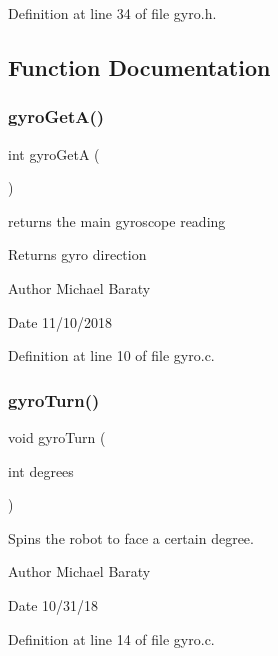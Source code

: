 Definition at line 34 of file gyro.\+h.



\subsection{Function Documentation}
\mbox{\label{gyro_8h_a5a5a31229f1d815f1b9ebd4ddd1a58ff}} 
\subsubsection{gyro\+Get\+A()}
{\footnotesize\ttfamily int gyro\+GetA (\begin{DoxyParamCaption}{ }\end{DoxyParamCaption})}



returns the main gyroscope reading 

\begin{DoxyReturn}{Returns}
gyro direction 
\end{DoxyReturn}
\begin{DoxyAuthor}{Author}
Michael Baraty 
\end{DoxyAuthor}
\begin{DoxyDate}{Date}
11/10/2018 
\end{DoxyDate}


Definition at line 10 of file gyro.\+c.

\mbox{\label{gyro_8h_a648e011460fe66e7157657d8c22578e9}} 
\subsubsection{gyro\+Turn()}
{\footnotesize\ttfamily void gyro\+Turn (\begin{DoxyParamCaption}\item[{int}]{degrees }\end{DoxyParamCaption})}



Spins the robot to face a certain degree. 

\begin{DoxyAuthor}{Author}
Michael Baraty 
\end{DoxyAuthor}
\begin{DoxyDate}{Date}
10/31/18 
\end{DoxyDate}


Definition at line 14 of file gyro.\+c.

